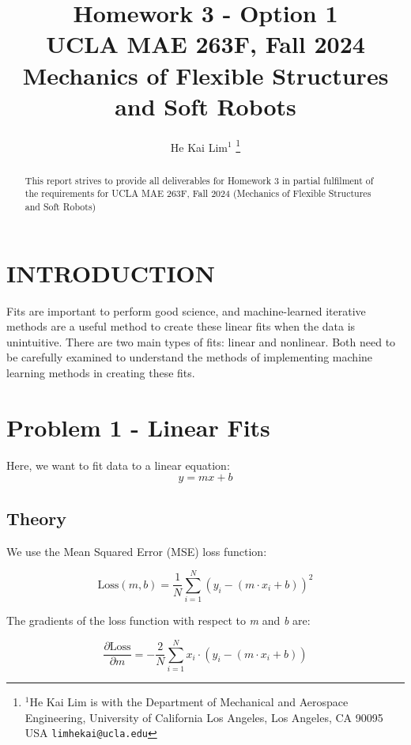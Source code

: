 \documentclass[letterpaper, 10 pt, conference]{ieeeconf}  %
\title{\LARGE \bf
Homework 3 - Option 1\\
\small{UCLA MAE 263F, Fall 2024\\
Mechanics of Flexible Structures and Soft Robots}%
}
\author{He Kai Lim$^{1}$ %
\thanks{$^{1}$He Kai Lim is with the 
Department of Mechanical and Aerospace Engineering, 
University of California Los Angeles, Los Angeles, CA 90095 USA
        {\tt\small limhekai@ucla.edu}}%
}
\begin{document}
\maketitle
\thispagestyle{empty}
\pagestyle{empty}


\begin{abstract}
   This report strives to provide all deliverables for Homework 3 in partial fulfilment of the requirements for UCLA MAE 263F, Fall 2024 (Mechanics of Flexible Structures and Soft Robots)
\end{abstract}


\section{INTRODUCTION}
Fits are important to perform good science, and machine-learned iterative methods are a useful method to create these linear fits when the data is unintuitive.
There are two main types of fits: linear and nonlinear.
Both need to be carefully examined to understand the methods of implementing machine learning methods in creating these fits.



\section{Problem 1 - Linear Fits}

Here, we want to fit data to a linear equation:
\begin{equation}
   y = mx + b
\end{equation}

\subsection{Theory}

We use the Mean Squared Error (MSE) loss function:

\begin{equation}
   \text{Loss}(m,b) = \frac{1}{N} \sum^{N}_{i=1}(y_i - (m \cdot x_i + b) )^2
\end{equation}

The gradients of the loss function with respect to \textit{m} and \textit{b} are:

\begin{equation}
   \frac{\partial \text{Loss}}{\partial m}
   =
   -\frac{2}{N}\sum^{N}_{i=1}x_i \cdot (y_i - (m \cdot x_i + b) )
\end{equation}
\end{document}
